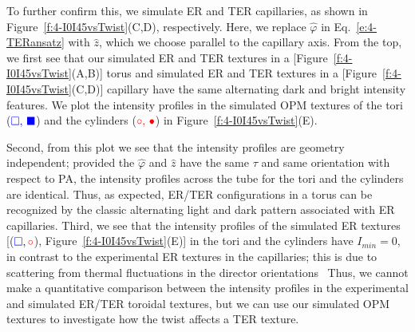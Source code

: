To further confirm this, we simulate ER and TER capillaries, as shown in Figure~\ref{f:4-I0I45vsTwist}(C,D), respectively.
Here, we replace $\hat{\varphi}$ in Eq.~\ref{e:4-TERansatz} with $\hat{z}$, which we choose parallel to the capillary axis.
From the top, we first see that our simulated ER and TER textures in a [Figure~\ref{f:4-I0I45vsTwist}(A,B)] torus and simulated ER and TER textures in a [Figure~\ref{f:4-I0I45vsTwist}(C,D)] capillary have the same alternating dark and bright intensity features.
We plot the intensity profiles in the simulated OPM textures of the tori (${\color{blue} \square,\,\blacksquare}$) and the cylinders (${\color{red} \circ,\,\bullet}$) in Figure~\ref{f:4-I0I45vsTwist}(E).

Second, from this plot we see that the intensity profiles are geometry independent; provided the $\hat{\varphi}$ and $\hat{z}$ have the same $\tau$ and same orientation with respect to PA, the intensity profiles across the tube for the tori and the cylinders are identical.
Thus, as expected, ER/TER configurations in a torus can be recognized by the classic alternating light and dark pattern associated with ER capillaries.
Third, we see that the intensity profiles of the simulated ER textures [(${\color{blue} \square},{\color{red} \circ}$), Figure~\ref{f:4-I0I45vsTwist}(E)] in the tori and the cylinders have $I_{min} = 0$, in contrast to the experimental ER textures in the capillaries; this is due to scattering from thermal fluctuations in the director orientations~\cite{RN33,RN309}
Thus, we cannot make a quantitative comparison between the intensity profiles in the experimental and simulated ER/TER toroidal textures, but we can use our simulated OPM textures to investigate how the twist affects a TER texture.


